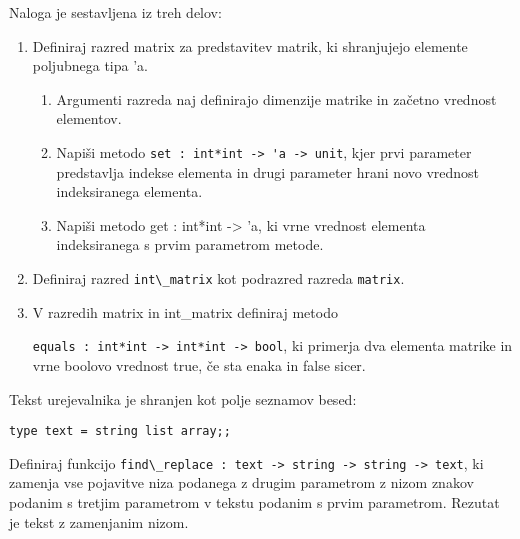 \begin{ex} Naloga je sestavljena iz treh delov:
\begin{enumerate}
  \item  Definiraj razred matrix za predstavitev matrik, ki shranjujejo
  elemente poljubnega tipa 'a.
\begin{enumerate}
    \item Argumenti razreda naj definirajo dimenzije matrike in za\v cetno
  vrednost elementov.
  \item Napi\v si metodo 
  \lstinline{set : int*int -> 'a -> unit}, kjer prvi parameter
  predstavlja indekse elementa in drugi parameter hrani novo vrednost
  indeksiranega elementa.
  \item Napi\v si metodo get : int*int -> 'a, ki vrne vrednost elementa
  indeksiranega s prvim parametrom metode.
\end{enumerate}
       
  \item Definiraj razred \lstinline{int\_matrix} kot podrazred razreda \lstinline{matrix}.

  \item V razredih matrix in int\_matrix definiraj metodo 
  
\noindent  \lstinline{equals : int*int -> int*int -> bool},
    ki primerja dva elementa matrike in vrne
  boolovo vrednost true, \v ce sta enaka in false sicer.
\end{enumerate}
\end{ex} 




\begin{ex}
  Tekst urejevalnika je shranjen kot polje seznamov besed:

\begin{lstlisting}
type text = string list array;;
\end{lstlisting}
  
  Definiraj funkcijo \lstinline{find\_replace : text -> string -> string -> text},
  ki zamenja vse pojavitve niza podanega z drugim parametrom z nizom
  znakov podanim s tretjim parametrom v tekstu podanim s prvim
  parametrom. Rezutat je tekst z zamenjanim nizom.
\end{ex} 




